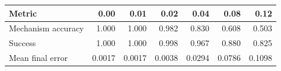 \begin{tabular}{lrrrrrr}
\toprule
Metric & 0.00 & 0.01 & 0.02 & 0.04 & 0.08 & 0.12 \\
\midrule
Mechanism accuracy & 1.000 & 1.000 & 0.982 & 0.830 & 0.608 & 0.503 \\
Success & 1.000 & 1.000 & 0.998 & 0.967 & 0.880 & 0.825 \\
Mean final error & 0.0017 & 0.0017 & 0.0038 & 0.0294 & 0.0786 & 0.1098 \\
\bottomrule
\end{tabular}

